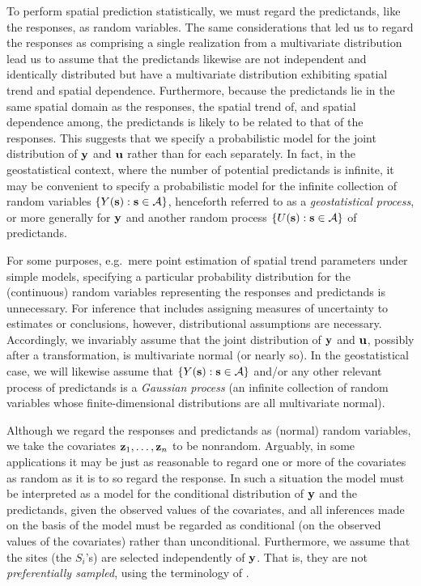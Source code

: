 To perform spatial prediction statistically, we must regard the predictands, like the responses, as random variables.  The same considerations that led us to regard the responses as comprising a single realization from a multivariate distribution lead us to assume that the predictands likewise are not independent and identically distributed but have a multivariate distribution exhibiting spatial trend and spatial dependence.  Furthermore, because the predictands lie in the same spatial domain as the responses, the spatial trend of, and spatial dependence among, the predictands is likely to be related to that of the responses.  This suggests that we specify a probabilistic model for the joint distribution of ${\bf y}$ and ${\bf u}$ rather than for each separately.  In fact, in the geostatistical context, where the number of potential predictands is infinite, it may be convenient to specify a probabilistic model for the infinite collection of random variables $\{Y({\bf s}): {\bf s}\in{\cal A}\}$, henceforth referred to as a {\em geostatistical process}, or more generally for ${\bf y}$ and another random process $\{U({\bf s}): {\bf s}\in {\cal A}\}$ of predictands.

For some purposes, e.g.\ mere point estimation of spatial trend parameters under simple models, specifying a particular probability distribution for the (continuous) random variables representing the responses and predictands is unnecessary.  For inference that includes assigning measures of uncertainty to estimates or conclusions, however, distributional assumptions are necessary.  Accordingly, we invariably assume that the joint distribution of ${\bf y}$ and ${\bf u}$, possibly after a transformation, is multivariate normal (or nearly so).  In the geostatistical case, we will likewise assume that $\{Y({\bf s}): {\bf s}\in{\cal A}\}$ and/or any other relevant process of predictands is a {\em Gaussian process} (an infinite collection of random variables whose finite-dimensional distributions are all multivariate normal).  

Although we regard the responses and predictands as (normal) random variables, we take the covariates ${\bf z}_1,\ldots,{\bf z}_n$ to be nonrandom.  Arguably, in some applications it may be just as reasonable to regard one or more of the covariates as random as it is to so regard the response.  In such a situation the model must be interpreted as a model for the conditional distribution of ${\bf y}$ and the predictands, given the observed values of the covariates, and all inferences made on the basis of the model must be regarded as conditional (on the observed values of the covariates) rather than unconditional.  Furthermore, we assume that the sites (the $S_i$'s) are selected independently of ${\bf y}$.  That is, they are not {\em preferentially sampled}, using the terminology of \citet{diggle2010geostatistical}.

